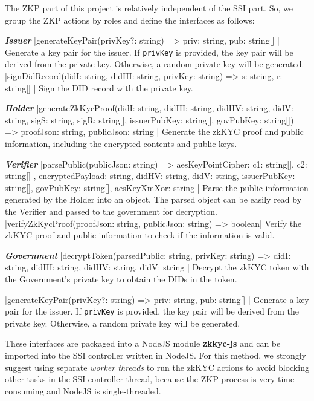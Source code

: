 \documentclass[
]{report}
\begin{document}
The ZKP part of this project is relatively independent of the SSI part.
So, we group the ZKP actions by roles and define the interfaces as
follows:

\textit{\textbf{Issuer}}
|generateKeyPair(privKey?: string) => { priv: string, pub: string[] }|
Generate a key pair for the issuer. If \texttt{privKey} is provided,
the key pair will be derived from the private key. Otherwise, a random
private key will be generated.
|signDidRecord(didI: string, didHI: string, privKey: string) => { s: string, r: string[] }|
Sign the DID record with the private key.

\textit{\textbf{Holder}}
|generateZkKycProof(didI: string, didHI: string, didHV: string, didV: string, sigS: string, sigR: string[], issuerPubKey: string{[}{]}, govPubKey: string{[}{]}) => { proofJson: string, publicJson: string }|
Generate the zkKYC proof and public information, including the
encrypted contents and public keys.

\textit{\textbf{Verifier}}
|parsePublic(publicJson: string) => { aesKeyPointCipher: { c1: string[], c2: string[] }, encryptedPayload: string, didHV: string, didV: string, issuerPubKey: string[], govPubKey: string[], aesKeyXmXor: string }|
Parse the public information generated by the Holder into an object.
The parsed object can be easily read by the Verifier and passed to the
government for decryption.
|verifyZkKycProof(proofJson: string, publicJson: string) => boolean|
Verify the zkKYC proof and public information to check if the information is valid.

\textit{\textbf{Government}}
|decryptToken(parsedPublic: string, privKey: string) => { didI: string, didHI: string, didHV: string, didV: string }|
Decrypt the zkKYC token with the Government's private key to obtain
the DIDs in the token.

|generateKeyPair(privKey?: string) => { priv: string, pub: string[] }|
Generate a key pair for the issuer. If \texttt{privKey} is provided,
the key pair will be derived from the private key. Otherwise, a random
private key will be generated.

These interfaces are packaged into a NodeJS module \textbf{zkkyc-js} and
can be imported into the SSI controller written in NodeJS. For this
method, we strongly suggest using separate \emph{worker threads} to run
the zkKYC actions to avoid blocking other tasks in the SSI controller
thread, because the ZKP process is very time-consuming and NodeJS is
single-threaded.
\end{document}
